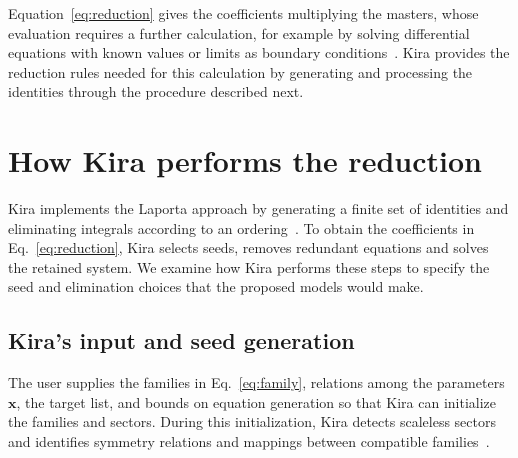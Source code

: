 Equation~\eqref{eq:reduction} gives the coefficients multiplying the
masters, whose evaluation requires a further calculation, for example by
solving differential equations with known values or limits as boundary
conditions~\cite{GehrmannRemiddi}. Kira provides the reduction rules
needed for this calculation by generating and processing the identities
through the procedure described next.

\section{How Kira performs the reduction}
\label{sec:kira-procedure}
Kira implements the Laporta approach by generating a finite set of
identities and eliminating integrals according to an
ordering~\cite{Laporta}. To obtain the coefficients in
Eq.~\eqref{eq:reduction}, Kira selects seeds, removes redundant
equations and solves the retained system. We examine how Kira performs
these steps to specify the seed and elimination choices that the
proposed models would make.

\subsection{Kira's input and seed generation}
The user supplies the families in Eq.~\eqref{eq:family}, relations among
the parameters $\boldsymbol x$, the target list, and bounds on equation
generation so that Kira can initialize the families and sectors. During
this initialization, Kira detects scaleless sectors and identifies symmetry
relations and mappings between compatible families~\cite{KiraOriginal}.

